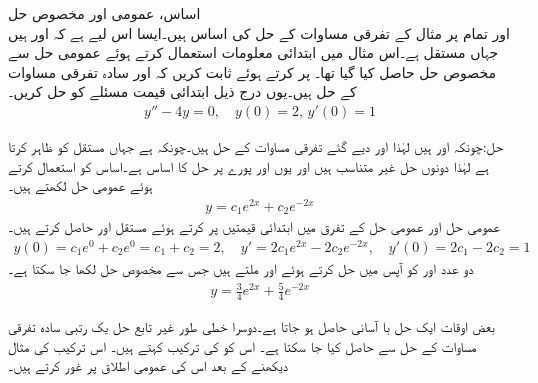 \quad اساس، عمومی اور مخصوص حل\\
 اور  تمام  پر مثال  کے تفرقی مساوات  کے حل کی اساس ہیں۔ایسا اس لیے ہے کہ  اور  ہیں جہاں  مستقل ہے۔اس مثال میں ابتدائی معلومات استعمال کرتے ہوئے عمومی حل سے مخصوص حل  حاصل کیا گیا تھا۔
پر کرتے ہوئے ثابت کریں کہ  اور  سادہ تفرقی مساوات  کے حل ہیں۔یوں درج ذیل ابتدائی قیمت مسئلے کو حل کریں۔
\begin{align*}
y''-4y=0, \quad y(0)=2, \, y'(0)=1
\end{align*}

حل:چونکہ  اور   ہیں لہٰذا  اور  دیے گئے تفرقی مساوات کے حل ہیں۔چونکہ  ہے جہاں  مستقل کو ظاہر کرتا ہے  لہٰذا دونوں حل غیر متناسب ہیں اور یوں  اور  پورے  پر  حل کا  اساس ہے۔اساس کو استعمال کرتے ہوئے عمومی حل لکھتے ہیں۔
\begin{align*}
y=c_1e^{2x}+c_2e^{-2x}
\end{align*}
عمومی حل اور عمومی حل کے تفرق میں ابتدائی قیمتیں پر کرتے ہوئے مستقل  اور  حاصل کرتے ہیں۔
\begin{align*}
y(0)=c_1e^{0}+c_2e^{0}=c_1+c_2=2, \quad y'=2c_1e^{2x}-2c_2e^{-2x}, \quad y'(0)=2c_1-2c_2=1
\end{align*}
دو عدد   اور  کو آپس میں حل کرتے ہوئے  اور  ملتے ہیں جس سے مخصوص حل لکھا جا سکتا ہے۔
\begin{align*}
y=\frac{3}{4}e^{2x}+\frac{5}{4}e^{-2x}
\end{align*}

بعض اوقات ایک حل با آسانی حاصل ہو جاتا ہے۔دوسرا خطی طور غیر تابع حل یک رتبی سادہ تفرقی مساوات کے حل سے حاصل کیا جا سکتا ہے۔ اس کو  کی ترکیب کہتے ہیں۔ اس ترکیب کی مثال دیکھنے کے بعد اس کی عمومی اطلاق پر غور کرتے ہیں۔

